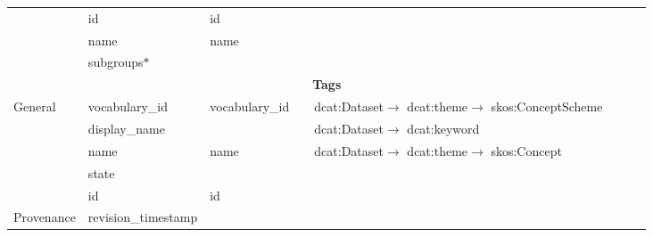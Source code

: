 \begin{landscape}
{\begin{longtable}{|p{1cm}|m{3.1cm}|m{2.4cm}|m{2.5cm}|p{3.8cm}|m{3.8cm}|m{5.55cm}|m{2.5cm}|}
\cline{2-8}
 & id & id &  &  &  &  & \tabularnewline
\cline{2-8}
 & name & name &  &  &  &  & \tabularnewline
\cline{2-8}
 & subgroups$\ast$ &  &  &  &  &  & \tabularnewline
\hline
\multicolumn{8}{|c|}{\cellcolor{blue!25}\textbf{Tags}}\tabularnewline
\hline
\multirow{5}{2cm}{General} & vocabulary\_id & vocabulary\_id &  & dcat:Dataset$\rightarrow$ dcat:theme$\rightarrow$ skos:ConceptScheme &  &  & \tabularnewline
\cline{2-8}
 & display\_name &  &  & dcat:Dataset$\rightarrow$ dcat:keyword &  &  & \tabularnewline
\cline{2-8}
 & name & name &  & dcat:Dataset$\rightarrow$ dcat:theme$\rightarrow$ skos:Concept &  &  & \tabularnewline
\cline{2-8}
 & state &  &  &  &  &  & \tabularnewline
\cline{2-8}
 & id & id &  &  &  &  & \tabularnewline
\hline
Provenance & revision\_timestamp &  &  &  &  &  & \tabularnewline
\hline
\end{longtable}
}
\end{landscape}

\restoregeometry
\pagestyle{standard}